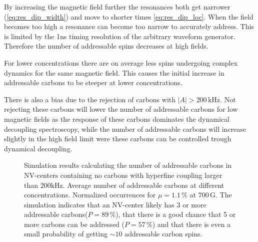 By increasing the magnetic field further the resonances both get narrower (\cref{eq:res_dip_width}) and move to shorter times \cref{eq:res_dip_loc}.
When the field becomes too high a resonance can become too narrow to accurately address.
This is limited by the 1ns timing resolution of the arbitrary waveform generator.
Therefore the number of addressable spins decreases at high fields.

For lower concentrations there are on average less spins undergoing complex dynamics for the same magnetic field.
This causes the initial increase in addressable carbons to be steeper at lower concentrations.

There is also a bias due to the rejection of carbons with $|A|>200\,\mathrm{kHz}$.
Not rejecting these carbons will lower the number of addressable carbons for low magnetic fields as the response of these carbons dominates the dynamical decoupling spectroscopy, while the number of addressable carbons will increase slightly in the high field limit were these carbons can be controlled trough dynamical decoupling.

\begin{figure}[htbp]
    \begin{subfigure}[t]{0.49\textwidth}\centering
        \caption{}
        \label{fig:Simulations_avg_n_vs_bfield}
    \end{subfigure}
    \begin{subfigure}[t]{0.49\textwidth}\centering
    \caption{}
    \label{fig:simulations_histogram_vs_Bfield}
    \end{subfigure}
    \caption{Simulation results calculating the number of addressable carbons in NV-centers containing no carbons with hyperfine coupling larger than $200\mathrm{kHz}$.  Average number of addressable carbons at different concentrations.  Normalized occurrences for $\mu = 1.1\,\%$ at $700\,\mathrm{G}$. The simulation indicates that an NV-center likely has 3 or more addressable carbons($P=89\,\%$), that there is a good chance that 5 or more carbons can be addressed ($P=57\,\%$) and that there is even a small probability of getting $\sim 10$ addressable carbon spins. }
    \label{fig:Simulation_results}
\end{figure}



